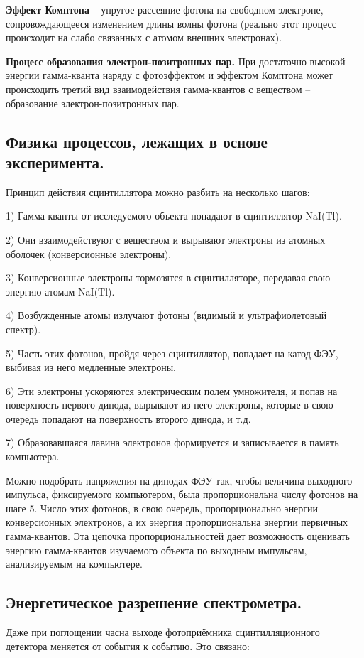 \documentclass[%
 reprint,
 amsmath,amssymb,
 aps,
]{revtex4-2}
\begin{document}
\textbf{Эффект Комптона} – упругое рассеяние фотона на свободном электроне,
сопровождающееся изменением длины волны фотона (реально этот процесс
происходит на слабо связанных с атомом внешних электронах). 

\textbf{Процесс образования электрон-позитронных пар.} При достаточно высокой энергии гамма-кванта наряду с фотоэффектом и эффектом Комптона
может происходить третий вид взаимодействия гамма-квантов с веществом –
образование электрон-позитронных пар. 

\subsection{Физика процессов, лежащих в основе эксперимента.}

Принцип действия сцинтиллятора можно разбить на несколько шагов:

1) Гамма-кванты от исследуемого объекта попадают в сцинтиллятор NaI(Tl).

2) Они взаимодействуют с веществом и вырывают электроны из атомных оболочек (конверсионные электроны).

3) Конверсионные электроны тормозятся в сцинтилляторе, передавая свою энергию атомам NaI(Tl).

4) Возбужденные атомы излучают фотоны (видимый и ультрафиолетовый спектр).

5) Часть этих фотонов, пройдя через сцинтиллятор, попадает на катод ФЭУ, выбивая из него медленные электроны.

6) Эти электроны ускоряются электрическим полем умножителя, и попав на поверхность первого динода, вырывают из него электроны, которые в свою очередь попадают на поверхность второго динода, и т.д. 

7) Образовавшаяся лавина электронов формируется и записывается в память компьютера.

Можно подобрать напряжения на динодах ФЭУ так, чтобы величина выходного импульса, фиксируемого компьютером, была пропорциональна числу фотонов на шаге 5. Число этих фотонов, в свою очередь, пропорционально энергии конверсионных электронов, а их энергия пропорциональна энергии первичных гамма-квантов. Эта цепочка пропорциональностей дает возможность оценивать энергию гамма-квантов изучаемого объекта по выходным импульсам, анализируемым на компьютере. 

\subsection{Энергетическое разрешение спектрометра.}
Даже при поглощении часна выходе фотоприёмника
сцинтилляционного детектора меняется от события к событию. Это связано:
\end{document}
